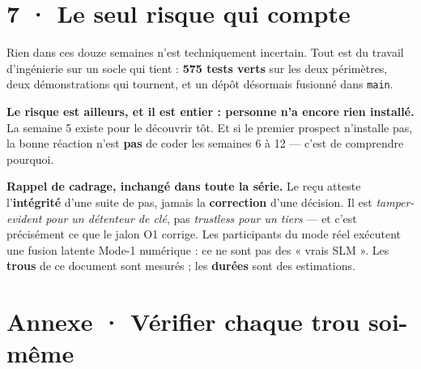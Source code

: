 \documentclass[10pt]{article}
\newcommand{\code}[1]{\texttt{\small #1}}
\begin{document}
\section{7 · Le seul risque qui compte}

Rien dans ces douze semaines n'est techniquement incertain. Tout est du travail d'ingénierie sur un
socle qui tient : \textbf{575 tests verts} sur les deux périmètres, deux démonstrations qui tournent,
et un dépôt désormais fusionné dans \code{main}.

\begin{alerte}
\textbf{Le risque est ailleurs, et il est entier : personne n'a encore rien installé.} La semaine 5
existe pour le découvrir tôt. Et si le premier prospect n'installe pas, la bonne réaction n'est
\textbf{pas} de coder les semaines 6 à 12 --- c'est de comprendre pourquoi.
\end{alerte}

\begin{these}
\small\textbf{Rappel de cadrage, inchangé dans toute la série.} Le reçu atteste l'\textbf{intégrité}
d'une suite de pas, jamais la \textbf{correction} d'une décision. Il est \emph{tamper-evident pour un
détenteur de clé}, pas \emph{trustless pour un tiers} --- et c'est précisément ce que le jalon O1
corrige. Les participants du mode réel exécutent une fusion latente Mode-1 numérique : ce ne sont pas
des « vrais SLM ». Les \textbf{trous} de ce document sont mesurés ; les \textbf{durées} sont des
estimations.
\end{these}

\section{Annexe · Vérifier chaque trou soi-même}
\end{document}
